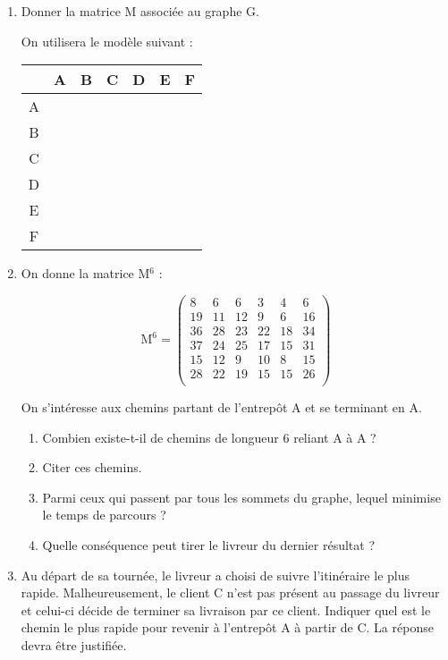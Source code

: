 \begin{enumerate} 
\item Donner la matrice M associée au graphe G.

On utilisera le modèle suivant :

\begin{center}
    \begin{tabular}{|*{7}{c|}}\cline{2-7}
    \multicolumn{1}{c|}{}%
        & A & B & C & D & E & F \\ \hline
    A   &   &   &   &   &   &   \\ \hline
    B   &   &   &   &   &   &   \\ \hline
    C   &   &   &   &   &   &   \\ \hline
    D   &   &   &   &   &   &   \\ \hline
    E   &   &   &   &   &   &   \\ \hline
    F   &   &   &   &   &   &   \\ \hline
    \end{tabular}
\end{center}

\item  On donne la matrice M$^6$ :

\[\text{M}^6 = 
\begin{pmatrix}
    8   &   6   &   6   &   3   &   4   &   6 \\
    19  &   11  &   12  &   9   &   6   &   16\\
    36  &   28  &   23  &   22  &   18  &   34\\
    37  &   24  &   25  &   17  &   15  &   31\\
    15  &   12  &   9   &   10  &   8   &   15\\
    28  &   22  &   19  &   15  &   15  &   26\\
\end{pmatrix}\]

On s'intéresse aux chemins partant de l'entrepôt A et se terminant en A.

   \begin{enumerate} 
   \item Combien existe-t-il de chemins de longueur 6 reliant A à A ?
   \item Citer ces chemins.
   \item Parmi ceux qui passent par tous les sommets du graphe, lequel minimise le temps de parcours ?
   \item Quelle conséquence peut tirer le livreur du dernier résultat ?
   \end{enumerate}
\item Au départ de sa tournée, le livreur a choisi de suivre l'itinéraire le plus rapide. Malheureusement, le client C n'est pas présent au passage du livreur et celui-ci décide de terminer sa livraison par ce client. Indiquer  quel est le chemin le plus rapide pour revenir à l'entrepôt A à partir de C. La réponse devra être justifiée.
\end{enumerate}

